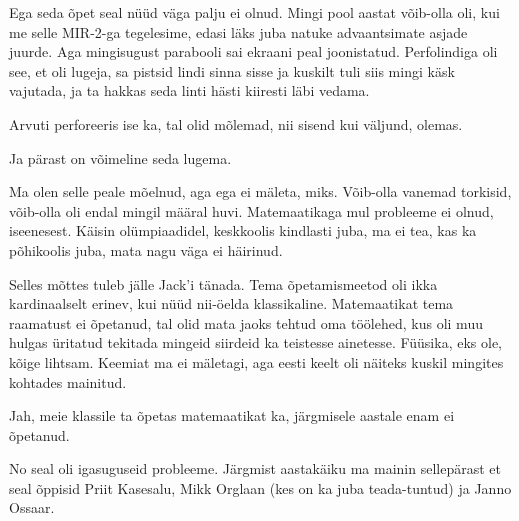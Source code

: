 
Ega seda õpet seal nüüd väga palju ei olnud. Mingi pool aastat võib-olla oli, 
kui me selle MIR-2-ga tegelesime, edasi läks juba natuke 
advaantsimate asjade juurde. Aga mingisugust parabooli sai ekraani peal 
joonistatud. Perfolindiga oli see, et  oli lugeja,  sa pistsid lindi sinna 
sisse ja kuskilt tuli siis mingi käsk vajutada, ja ta hakkas seda linti hästi 
kiiresti läbi vedama.


Arvuti perforeeris ise ka, tal olid mõlemad, nii sisend kui väljund, olemas.


Ja pärast on võimeline seda lugema. 


Ma olen selle peale mõelnud, aga ega  ei mäleta, miks. Võib-olla vanemad 
torkisid, võib-olla oli endal mingil määral huvi. Matemaatikaga mul probleeme 
ei olnud, iseenesest. Käisin olümpiaadidel, keskkoolis kindlasti juba, ma ei 
tea, kas ka põhikoolis juba, mata nagu väga ei häirinud.


Selles mõttes tuleb jälle Jack'i tänada. Tema õpetamismeetod 
oli ikka kardinaalselt erinev, kui nüüd nii-öelda klassikaline. Matemaatikat 
tema raamatust ei õpetanud, tal olid mata jaoks tehtud oma töölehed, kus oli 
muu hulgas üritatud tekitada mingeid siirdeid ka teistesse ainetesse. Füüsika, 
eks ole, kõige lihtsam. Keemiat ma ei mäletagi, aga eesti keelt oli näiteks 
kuskil mingites kohtades mainitud. 


Jah, meie klassile ta õpetas matemaatikat ka, järgmisele aastale enam ei 
õpetanud.  


No seal oli igasuguseid probleeme. Järgmist aastakäiku ma mainin sellepärast et 
seal õppisid Priit Kasesalu, Mikk 
Orglaan (kes on ka juba teada-tuntud) ja Janno 
Ossaar. 

